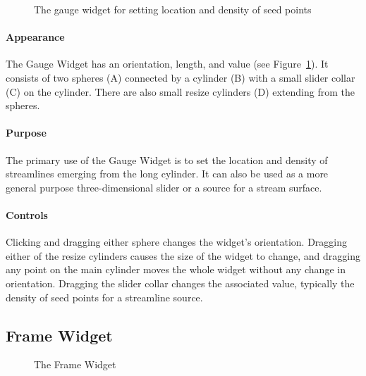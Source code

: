 \begin{figure}[htb]
  \begin{makeimage}
  \end{makeimage}
  \gaugewidget
  \caption{\label{fig:gaugewidget} The gauge widget for setting location and
    density of seed points}
\end{figure}

\paragraph{Appearance} The Gauge
Widget has an orientation, length, and value (see Figure~\ref{fig:gaugewidget}). It consists of two spheres (A) connected by a cylinder (B) with a
small slider collar (C) on the cylinder.  There are also small resize
cylinders (D) extending from the spheres.

\paragraph{Purpose} The primary use of the Gauge Widget is to set the
location and density of streamlines emerging from the long cylinder.  It
can also be used as a more general purpose three-dimensional slider or a
source for a stream surface. 

\paragraph{Controls} Clicking and dragging either sphere changes the widget's orientation.  Dragging either of the resize
cylinders causes the size of the widget to change, and dragging any point on
the main cylinder moves the whole widget without any change in orientation.
Dragging the slider collar changes the associated value, typically the
density of seed points for a streamline source.

\subsection{Frame Widget}
\label{sec:view-framewidget} 

\begin{figure}[htb]
  \begin{makeimage}
  \end{makeimage}
  \framewidget
  \caption{\label{fig:framewidget} The Frame Widget}
\end{figure}


